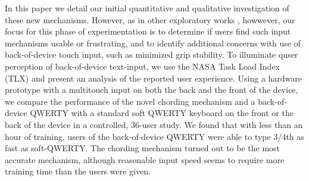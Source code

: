 In this paper we detail our initial quantitative and qualitative
investigation of these new mechanisms. However, as in other
exploratory works \cite{RearType}, howwever, our focus for this phase
of experimentation is to determine if users find such input mechanisms
usable or frustrating, and to identify additional concerns with use of
back-of-device touch input, such as minimized grip stability. To
illuminate quser perception of back-of-device text-input, we use the
NASA Task Load Index (TLX) and present an analysis of the reported
user experience. Using a hardware prototype with a multitouch input on
both the back and the front of the device, we compare the performance
of the novel chording mechanism and a back-of-device QWERTY with a
standard soft QWERTY keyboard on the front or the back of the device
in a controlled, 36-user study. We found that with less than an hour
of training, users of the back-of-device QWERTY were able to type
3/4th as fast as soft-QWERTY.  The chording mechanism turned out to be
the most accurate mechanism, although reasonable input speed seems to
require more training time than the users were given.
